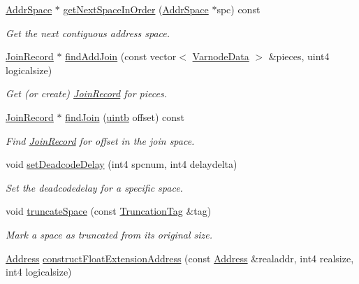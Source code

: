 \begin{DoxyCompactItemize}
\mbox{\hyperlink{class_addr_space}{Addr\+Space}} $\ast$ \mbox{\hyperlink{class_addr_space_manager_abe31b83fccddf3c6d9d35e981f203b19}{get\+Next\+Space\+In\+Order}} (\mbox{\hyperlink{class_addr_space}{Addr\+Space}} $\ast$spc) const
\begin{DoxyCompactList}\small\item\em Get the next {\itshape contiguous} address space. \end{DoxyCompactList}\item 
\mbox{\hyperlink{class_join_record}{Join\+Record}} $\ast$ \mbox{\hyperlink{class_addr_space_manager_a1b9e7e934e22b6bea3b2b949fd2b2159}{find\+Add\+Join}} (const vector$<$ \mbox{\hyperlink{struct_varnode_data}{Varnode\+Data}} $>$ \&pieces, uint4 logicalsize)
\begin{DoxyCompactList}\small\item\em Get (or create) \mbox{\hyperlink{class_join_record}{Join\+Record}} for {\itshape pieces}. \end{DoxyCompactList}\item 
\mbox{\hyperlink{class_join_record}{Join\+Record}} $\ast$ \mbox{\hyperlink{class_addr_space_manager_adff0f9e662ebffdf724dca82b6b544bb}{find\+Join}} (\mbox{\hyperlink{types_8h_a2db313c5d32a12b01d26ac9b3bca178f}{uintb}} offset) const
\begin{DoxyCompactList}\small\item\em Find \mbox{\hyperlink{class_join_record}{Join\+Record}} for {\itshape offset} in the join space. \end{DoxyCompactList}\item 
void \mbox{\hyperlink{class_addr_space_manager_a309aefdf92c8a631096916128772a116}{set\+Deadcode\+Delay}} (int4 spcnum, int4 delaydelta)
\begin{DoxyCompactList}\small\item\em Set the deadcodedelay for a specific space. \end{DoxyCompactList}\item 
void \mbox{\hyperlink{class_addr_space_manager_aef7d980ea2fc0c6450e941fd7dbec7e6}{truncate\+Space}} (const \mbox{\hyperlink{class_truncation_tag}{Truncation\+Tag}} \&tag)
\begin{DoxyCompactList}\small\item\em Mark a space as truncated from its original size. \end{DoxyCompactList}\item 
\mbox{\hyperlink{class_address}{Address}} \mbox{\hyperlink{class_addr_space_manager_aed824a71a1d12bb5d167a7a488eb7198}{construct\+Float\+Extension\+Address}} (const \mbox{\hyperlink{class_address}{Address}} \&realaddr, int4 realsize, int4 logicalsize)

\end{DoxyCompactItemize}
